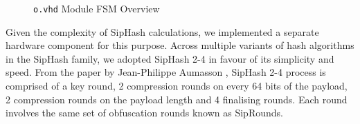 \documentclass[a4paper]{report}
\newcommand{\code}{\texttt}
\begin{document}
\begin{figure}[h!]
\begin{minipage}{.45\textwidth}
  \caption{\code{o.vhd} Module FSM Overview}
  \label{fig:coreout-fsm}
\end{minipage}
\end{figure}

Given the complexity of SipHash calculations, we implemented a separate hardware component for this purpose. Across multiple variants of hash algorithms in the SipHash family, we adopted SipHash 2-4 in favour of its simplicity and speed. From the paper by Jean-Philippe Aumasson \cite{aumasson-bernstein-2012}, SipHash 2-4 process is comprised of a key round, 2 compression rounds on every 64 bits of the payload, 2 compression rounds on the payload length and 4 finalising rounds. Each round involves the same set of obfuscation rounds known as SipRounds.
\end{document}

